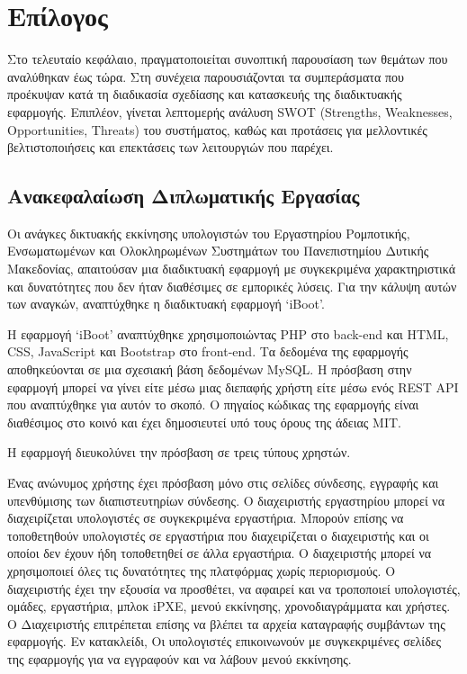 \chapter{Επίλογος}
Στο τελευταίο κεφάλαιο, πραγματοποιείται συνοπτική παρουσίαση των θεμάτων που αναλύθηκαν έως τώρα. Στη συνέχεια παρουσιάζονται τα συμπεράσματα που προέκυψαν κατά τη διαδικασία σχεδίασης και κατασκευής της διαδικτυακής εφαρμογής.
Επιπλέον, γίνεται λεπτομερής ανάλυση SWOT (Strengths, Weaknesses, Opportunities, Threats) του συστήματος, καθώς και προτάσεις για μελλοντικές βελτιστοποιήσεις και επεκτάσεις των λειτουργιών που παρέχει.

\section{Ανακεφαλαίωση Διπλωματικής Εργασίας}
Οι ανάγκες δικτυακής εκκίνησης υπολογιστών του Εργαστηρίου Ρομποτικής, Ενσωματωμένων και Ολοκληρωμένων Συστημάτων του Πανεπιστημίου Δυτικής Μακεδονίας, απαιτούσαν μια διαδικτυακή εφαρμογή με συγκεκριμένα χαρακτηριστικά και δυνατότητες που δεν ήταν διαθέσιμες σε εμπορικές λύσεις. Για την κάλυψη αυτών των αναγκών, αναπτύχθηκε η διαδικτυακή εφαρμογή `iBoot'.

Η εφαρμογή `iBoot' αναπτύχθηκε χρησιμοποιώντας PHP στο back-end και HTML, CSS, JavaScript και Bootstrap στο front-end. Τα δεδομένα της εφαρμογής αποθηκεύονται σε μια σχεσιακή βάση δεδομένων MySQL. Η πρόσβαση στην εφαρμογή μπορεί να γίνει είτε μέσω μιας διεπαφής χρήστη είτε μέσω ενός REST API που αναπτύχθηκε για αυτόν το σκοπό. Ο πηγαίος κώδικας της εφαρμογής είναι διαθέσιμος στο κοινό και έχει δημοσιευτεί υπό τους όρους της άδειας MIT.

Η εφαρμογή διευκολύνει την πρόσβαση σε τρεις τύπους χρηστών.

Ένας ανώνυμος χρήστης έχει πρόσβαση μόνο στις σελίδες σύνδεσης, εγγραφής και υπενθύμισης των διαπιστευτηρίων σύνδεσης.
Ο διαχειριστής εργαστηρίου μπορεί να διαχειρίζεται υπολογιστές σε συγκεκριμένα εργαστήρια. Μπορούν επίσης να τοποθετηθούν υπολογιστές σε εργαστήρια που διαχειρίζεται ο διαχειριστής και οι οποίοι δεν έχουν ήδη τοποθετηθεί σε άλλα εργαστήρια.
Ο διαχειριστής μπορεί να χρησιμοποιεί όλες τις δυνατότητες της πλατφόρμας χωρίς περιορισμούς. Ο διαχειριστής έχει την εξουσία να προσθέτει, να αφαιρεί και να τροποποιεί υπολογιστές, ομάδες, εργαστήρια, μπλοκ iPXE, μενού εκκίνησης, χρονοδιαγράμματα και χρήστες. Ο Διαχειριστής επιτρέπεται επίσης να βλέπει τα αρχεία καταγραφής συμβάντων της εφαρμογής.
Εν κατακλείδι,
Οι υπολογιστές επικοινωνούν με συγκεκριμένες σελίδες της εφαρμογής για να εγγραφούν και να λάβουν μενού εκκίνησης.


